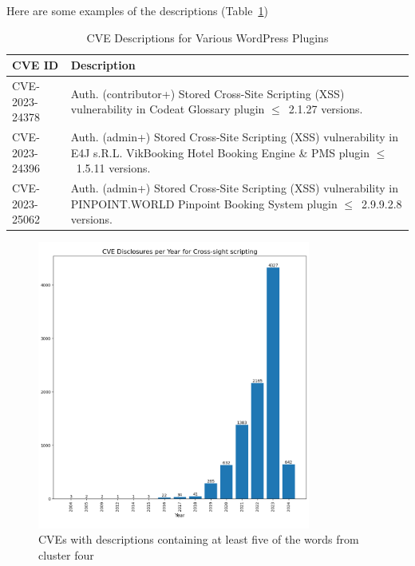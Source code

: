 \documentclass[12pt]{article}
\begin{document}
Here are some examples of the descriptions (Table~\ref{tab:cve-descriptions})

\begin{table}[h]
	\centering
	\begin{tabular}{|p{}|p{}|}
		\hline
		\textbf{CVE ID} & \textbf{Description}                                                    \\
		\hline

		CVE-2023-24378  & Auth. (contributor+) Stored Cross-Site Scripting (XSS) vulnerability in
		Codeat Glossary plugin $\leq$~2.1.27 versions.                                            \\

		\hline

		CVE-2023-24396  & Auth. (admin+) Stored Cross-Site Scripting (XSS) vulnerability in E4J
		s.R.L. VikBooking Hotel Booking Engine \& PMS plugin $\leq$~1.5.11 versions.              \\

		\hline

		CVE-2023-25062  & Auth. (admin+) Stored Cross-Site Scripting (XSS) vulnerability in
		PINPOINT.WORLD Pinpoint Booking System plugin $\leq$~2.9.9.2.8 versions.                  \\

		\hline
	\end{tabular}
	\caption{CVE Descriptions for Various WordPress Plugins}
	\label{tab:cve-descriptions}
\end{table}


\begin{figure}[H]
	\centering

	\includegraphics[width=0.8\textwidth]{figures/cross_site_per_year.pdf}
	\caption{\label{fig:cross_site_per_year}CVEs with descriptions containing at least five of the
		words from cluster four}
\end{figure}
\end{document}
